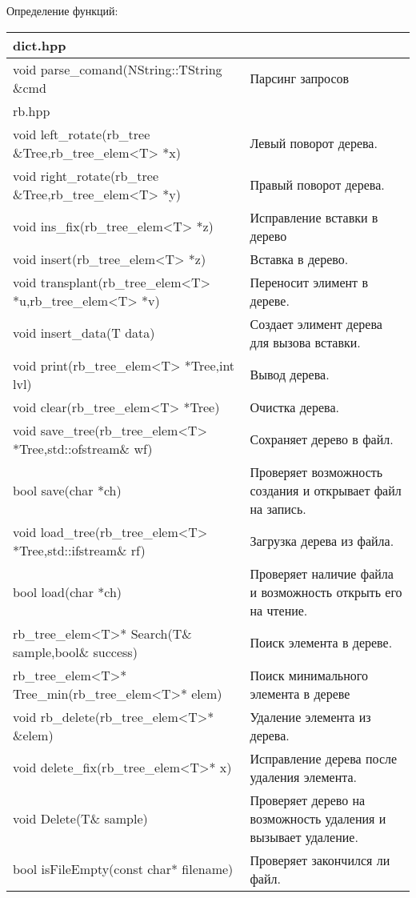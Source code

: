 \newpage
Определение функций:
\begin{longtable}{|p{7.5cm}|p{7.5cm}|}
\hline
\rowcolor{lightgray}
\multicolumn{2}{|c|} {dict.hpp}\\
\hline
void parse\_comand(NString::TString \&cmd&Парсинг запросов\\
\hline
\rowcolor{lightgray}
\multicolumn{2}{|c|} {rb.hpp}\\
\hline
void left\_rotate(rb\_tree \&Tree,rb\_tree\_elem<T> *x)&Левый поворот дерева.\\
\hline
void right\_rotate(rb\_tree \&Tree,rb\_tree\_elem<T> *y)&Правый поворот дерева.\\
\hline
void ins\_fix(rb\_tree\_elem<T> *z)&Исправление вставки в дерево\\
\hline
void insert(rb\_tree\_elem<T> *z)&Вставка в дерево.\\
\hline
void transplant(rb\_tree\_elem<T> *u,rb\_tree\_elem<T> *v)&Переносит элимент в дереве.\\
\hline
void insert\_data(T data)&Создает элимент дерева для вызова вставки.\\
\hline
void print(rb\_tree\_elem<T> *Tree,int lvl)&Вывод дерева.\\
\hline
void clear(rb\_tree\_elem<T> *Tree)&Очистка дерева.\\
\hline
void save\_tree(rb\_tree\_elem<T> *Tree,std::ofstream\& wf)&Сохраняет дерево в файл.\\
\hline
bool save(char *ch)&Проверяет возможность создания и открывает файл на запись.\\
\hline
void load\_tree(rb\_tree\_elem<T> *Tree,std::ifstream\& rf)&Загрузка дерева из файла.\\
\hline
bool load(char *ch)&Проверяет наличие файла и возможность открыть его на чтение.\\
\hline
rb\_tree\_elem<T>* Search(T\& sample,bool\& success)&Поиск элемента в дереве.\\
\hline
rb\_tree\_elem<T>* Tree\_min(rb\_tree\_elem<T>* elem)&Поиск минимального элемента в дереве\\
\hline
void rb\_delete(rb\_tree\_elem<T>* \&elem)&Удаление элемента из дерева.\\
\hline
void delete\_fix(rb\_tree\_elem<T>* x)&Исправление дерева после удаления элемента.\\
\hline
void Delete(T\& sample)&Проверяет дерево на возможность удаления и вызывает удаление.\\
\hline
bool isFileEmpty(const char* filename)&Проверяет закончился ли файл.\\
\hline
\end{longtable}

